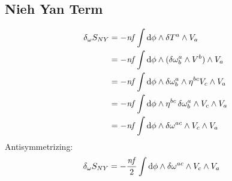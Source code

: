 \documentclass[12pt]{article}
\begin{document}
\subsection{Nieh Yan Term}
\begin{align*}
  \var_\omega{S_{NY}} &= -\mathit{nf} \int \dd{\phi} \wedge \var{T^a} \wedge V_a \\
  &= -\mathit{nf} \int \dd{\phi} \wedge (\var{\omega^a_b} \wedge V^b) \wedge V_a \\
  &= -\mathit{nf} \int \dd{\phi} \wedge \var{\omega^a_b} \wedge \eta^{bc}V_c \wedge V_a \\
  &= -\mathit{nf} \int \dd{\phi} \wedge \eta^{bc}\var{\omega^a_b} \wedge V_c \wedge V_a \\
  &= -\mathit{nf} \int \dd{\phi} \wedge \var{\omega^{ac}} \wedge V_c \wedge V_a \\
\end{align*}
Antisymmetrizing:
\begin{align*}
  \var_\omega{S_{NY}} &= -\frac{\mathit{nf}}{2} \int \dd{\phi} \wedge \var{\omega^{ac}} \wedge V_c \wedge V_a
\end{align*}
\end{document}

